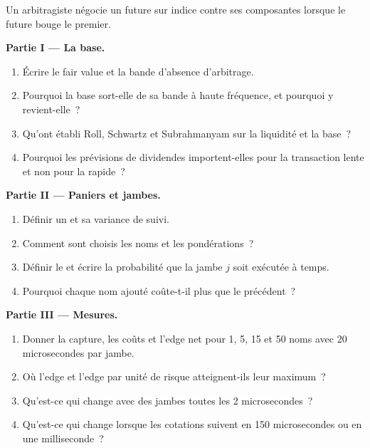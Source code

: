 \begin{problem}\label{pb:hf:index-and-basket-arbitrage:1}
Un arbitragiste négocie un future sur indice contre ses composantes lorsque le future bouge le premier.

\medskip\noindent\textbf{Partie I --- La base.}
\begin{enumerate}
\item Écrire le fair value et la bande d'absence d'arbitrage.
\item Pourquoi la base sort-elle de sa bande à haute fréquence, et pourquoi y revient-elle~?
\item Qu'ont établi Roll, Schwartz et Subrahmanyam sur la liquidité et la base~?
\item Pourquoi les prévisions de dividendes importent-elles pour la transaction lente et non pour la rapide~?
\end{enumerate}

\medskip\noindent\textbf{Partie II --- Paniers et jambes.}
\begin{enumerate}[resume]
\item Définir un  et sa variance de suivi.
\item Comment sont choisis les noms et les pondérations~?
\item Définir le  et écrire la probabilité que la jambe $j$ soit exécutée à temps.
\item Pourquoi chaque nom ajouté coûte-t-il plus que le précédent~?
\end{enumerate}

\medskip\noindent\textbf{Partie III --- Mesures.}
\begin{enumerate}[resume]
\item Donner la capture, les coûts et l'edge net pour 1, 5, 15 et 50 noms avec 20 microsecondes par jambe.
\item Où l'edge et l'edge par unité de risque atteignent-ils leur maximum~?
\item Qu'est-ce qui change avec des jambes toutes les 2 microsecondes~?
\item Qu'est-ce qui change lorsque les cotations suivent en 150 microsecondes ou en une milliseconde~?
\end{enumerate}


\end{problem}
